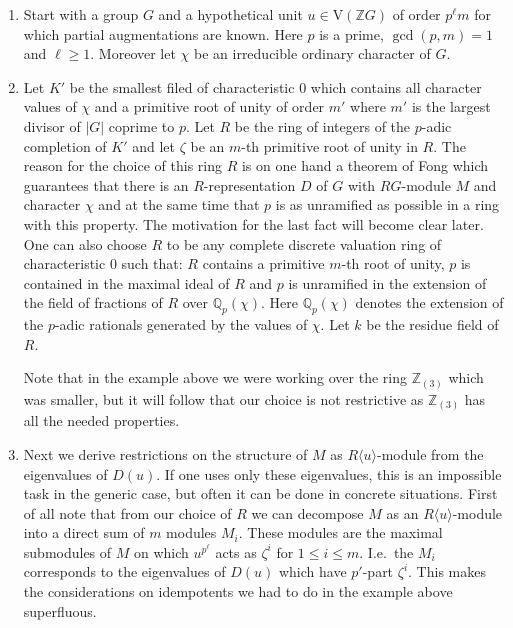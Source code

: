 \documentclass[10pt,a4paper,reqno]{amsart}
\theoremstyle{definition}
\theoremstyle{remark}
\newcommand{\V}{\mathrm{V}}
\newcommand{\ZZ}{\mathbb{Z}}
\begin{document}
\begin{enumerate}
\item Start with a group $G$ and a hypothetical unit $u \in \V(\ZZ G)$ of order $p^\ell m$ for which partial augmentations are known. Here $p$ is a prime, $\gcd(p, m) =1$ and $\ell \geqslant 1$. Moreover let $\chi$ be an irreducible ordinary character of $G$.

\item Let $K'$ be the smallest filed of characteristic $0$ which contains all character values of $\chi$ and a primitive root of unity of order $m'$ where $m'$ is the largest divisor of $|G|$ coprime to $p$. Let $R$ be the ring of integers of the $p$-adic completion of $K'$ and let $\zeta$ be an $m$-th primitive root of unity in $R$. The reason for the choice of this ring $R$ is on one hand a theorem of Fong which guarantees that there is an $R$-representation $D$ of $G$ with $RG$-module $M$ and character $\chi$ and at the same time that $p$ is as unramified as possible in a ring with this property. The motivation for the last fact will become clear later. One can also choose $R$ to be any complete discrete valuation ring of characteristic $0$ such that: $R$ contains a primitive $m$-th root of unity, $p$ is contained in the maximal ideal of $R$ and $p$ is unramified in the extension of the field of fractions of $R$ over $\mathbb{Q}_p(\chi)$. Here $\mathbb{Q}_p(\chi)$ denotes the extension of the $p$-adic rationals generated by the values of $\chi$. %
Let $k$ be the residue field of $R$. 

Note that in the example above we were working over the ring $\ZZ_{(3)}$ which was smaller, but it will follow that our choice is not restrictive as $\ZZ_{(3)}$ has all the needed properties.

\item Next we derive restrictions on the structure of $M$ as $R\langle u \rangle$-module from the eigenvalues of $D(u)$. If one uses only these eigenvalues, this is an impossible task in the generic case, but often it can be done in concrete situations. First of all note that from our choice of $R$ we can decompose $M$ as an $R\langle u \rangle$-module into a direct sum of $m$ modules $M_i$. These modules are the maximal submodules of $M$ on which $u^{p^\ell}$ acts as $\zeta^i$ for $1 \leqslant i \leqslant m$. I.e.\ the $M_i$ corresponds to the eigenvalues of $D(u)$ which have $p'$-part $\zeta^i$.  This makes the considerations on idempotents we had to do in the example above superfluous.


\end{enumerate}
\end{document}
